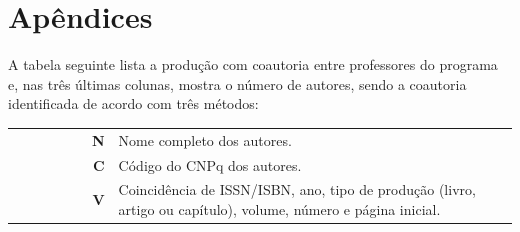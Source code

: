 \documentclass[12pt,brazil]{article}\usepackage[]{graphicx}\usepackage[]{xcolor}
\newcounter{tabela}
\begin{document}
\vspace{0.5cm}


\clearpage

\section{Apêndices}

A tabela seguinte lista a produção com coautoria entre professores do
programa e, nas três últimas colunas, mostra o número de autores, sendo a
coautoria identificada de acordo com três métodos:

\vspace{2mm}

\begin{tabular}{crl}
 ~~~~~~~~~ &  \textbf{N} & Nome completo dos autores.\\
 ~~~~~~~~~ &  \textbf{C} & Código do CNPq dos autores.\\
 ~~~~~~~~~ &  \textbf{V} & Coincidência de ISSN/ISBN, ano, tipo de produção (livro, artigo ou capítulo), volume, número e página inicial. \\
\end{tabular}
\end{document}
